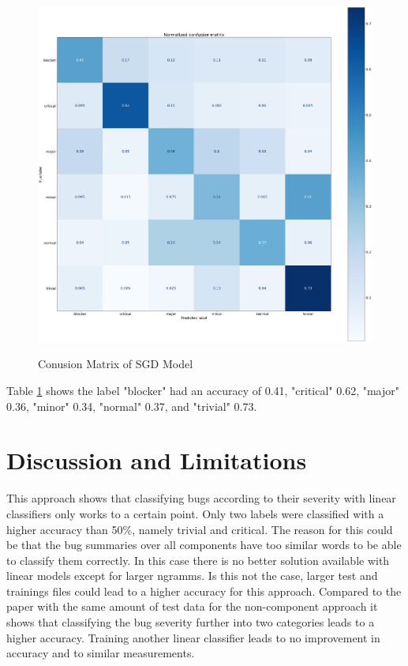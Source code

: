 \documentclass[sigconf,screen]{acmart}
\begin{document}
\begin{figure}[h]
	\caption{Conusion Matrix of SGD Model}
	\centering
	\includegraphics[scale=0.1]{norm_conf_matrix_sgd}
	\label{fig:confMatSGD}	
\end{figure}

Table \ref{fig:confMatSGD} shows the label "blocker" had an accuracy of 0.41, "critical"  0.62, "major" 0.36, "minor" 0.34, "normal" 0.37, and "trivial" 0.73.


\section{Discussion and Limitations}
This approach shows that classifying bugs according to their severity with linear classifiers only works to a certain point. Only two labels were classified with a higher accuracy than 50\%, namely trivial and critical. The reason for this could be that the bug summaries over all components have too similar words to be able to classify them correctly. In this case there is no better solution available with linear models except for larger ngramms. Is this not the case, larger test and trainings files could lead to a higher accuracy for this approach. Compared to the paper \cite{ourPaper} with the same amount of test data for the non-component approach it shows that classifying the bug severity further into two categories leads to a higher accuracy. Training another linear classifier leads to no improvement in accuracy and to similar measurements.
\end{document}
